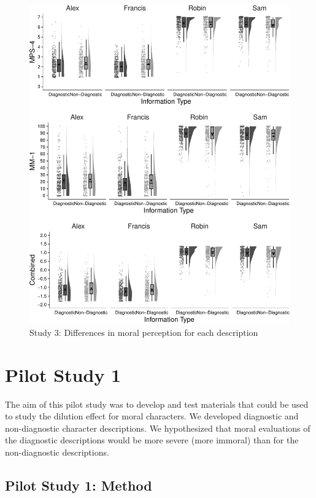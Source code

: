 \documentclass[
  man,floatsintext]{apa6}
\begin{document}
\begin{figure}[!h]
\includegraphics[width=\textwidth,]{Supplementary_files/figure-latex/S3allscenariosPlot-1} \caption{Study 3: Differences in moral perception for each description}\label{fig:S3allscenariosPlot}
\end{figure}

\pagebreak

\section{Pilot Study 1}\label{pilot-study-1}

The aim of this pilot study was to develop and test materials that could be used to study the dilution effect for moral characters. We developed diagnostic and non-diagnostic character descriptions. We hypothesized that moral evaluations of the diagnostic descriptions would be more severe (more immoral) than for the non-diagnostic descriptions.

\subsection{Pilot Study 1: Method}\label{pilot-study-1-method}
\end{document}
